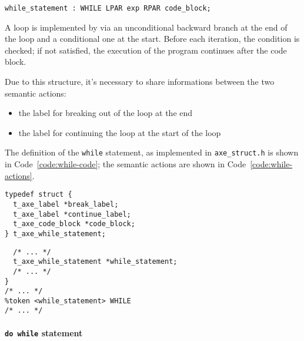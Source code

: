 \documentclass[english]{article}
\begin{document}
\begin{onepage}
  \begin{lstlisting}[language=LANCE, caption={Grammar for the while statement}, label={code:while-grammar}]
while_statement : WHILE LPAR exp RPAR code_block;
\end{lstlisting}
\end{onepage}

A loop is implemented by via an unconditional backward branch at the end of the loop and a conditional one at the start.
Before each iteration, the condition is checked; if not satisfied, the execution of the program continues after the code block.

Due to this structure, it's necessary to share informations between the two semantic actions:

\begin{itemize}
  \item the label for breaking out of the loop at the end
  \item the label for continuing the loop at the start of the loop
\end{itemize}

The definition of the \texttt{while} statement, as implemented in \texttt{axe\_struct.h} is shown in Code~\ref{code:while-code}; the semantic actions are shown in Code~\ref{code:while-actions}.

\begin{onepage}
  \begin{lstlisting}[language=LANCE, caption={Code for the while statement}, label={code:while-code}]
typedef struct {
  t_axe_label *break_label;
  t_axe_label *continue_label;
  t_axe_code_block *code_block;
} t_axe_while_statement;
\end{lstlisting}
\end{onepage}

\begin{onepage}
  \begin{lstlisting}[language=LANCE, caption={Semantic actions for the while statement}, label={code:while-actions}]
%union {
  /* ... */
  t_axe_while_statement *while_statement;
  /* ... */
}
/* ... */
%token <while_statement> WHILE
/* ... */
  \end{lstlisting}
\end{onepage}

\paragraph{\texttt{do while} statement}
\end{document}
